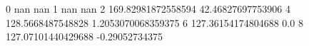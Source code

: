 0 nan nan
1 nan nan
2 169.82981872558594 42.46827697753906
4 128.5668487548828 1.2053070068359375
6 127.36154174804688 0.0
8 127.07101440429688 -0.29052734375
